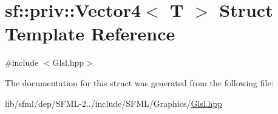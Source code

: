 \hypertarget{structsf_1_1priv_1_1_vector4}{\section{sf\-:\-:priv\-:\-:Vector4$<$ T $>$ Struct Template Reference}
\label{structsf_1_1priv_1_1_vector4}
}


{\ttfamily \#include $<$Glsl.\-hpp$>$}



The documentation for this struct was generated from the following file\-:\begin{DoxyCompactItemize}
\item 
lib/sfml/dep/\-S\-F\-M\-L-\/2../include/\-S\-F\-M\-L/\-Graphics/\hyperlink{_glsl_8hpp}{Glsl.\-hpp}\end{DoxyCompactItemize}
